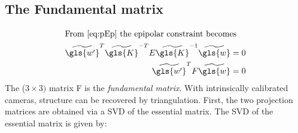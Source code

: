 \subsection{The Fundamental matrix}

\begin{align}
    \intertext{From~\eqref{eq:pEp} the epipolar constraint becomes}
    \widetilde{\gls{w'}} ^T \widetilde{\gls{K}}^{-T} E \widetilde{\gls{K}}^{-1} \widetilde{\gls{w}}  &= 0 \\
    \widetilde{\gls{w'}} ^T F \widetilde{\gls{w}}  &= 0
\end{align}
The (\(3\times3)\) matrix \gls{F} is the \emph{fundamental matrix}.
With intrinsically calibrated cameras, structure can be recovered by triangulation.
First, the two projection matrices are obtained via a \gls{SVD} of the essential matrix.
The \gls{SVD} of the essential matrix is given by:

